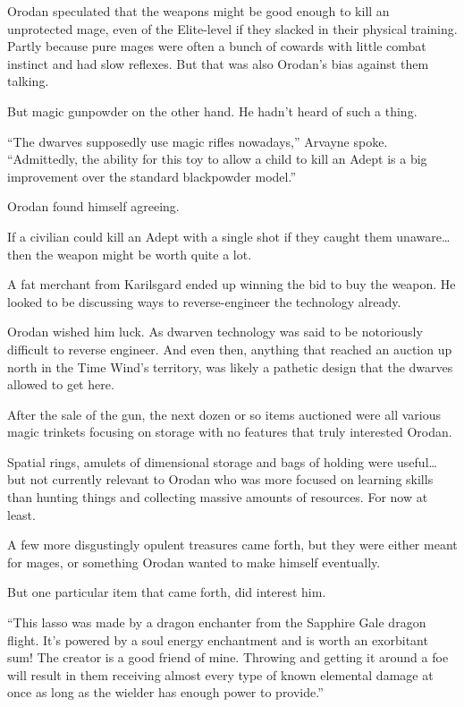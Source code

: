 \documentclass[a4paper,10pt]{book}
\begin{document}
Orodan speculated that the weapons might be good enough to kill an unprotected mage, even of the Elite-level if they slacked in their physical training. Partly because pure mages were often a bunch of cowards with little combat instinct and had slow reflexes. But that was also Orodan’s bias against them talking.\par
But magic gunpowder on the other hand. He hadn’t heard of such a thing.\par
“The dwarves supposedly use magic rifles nowadays,” Arvayne spoke. “Admittedly, the ability for this toy to allow a child to kill an Adept is a big improvement over the standard blackpowder model.”\par
Orodan found himself agreeing.\par
If a civilian could kill an Adept with a single shot if they caught them unaware… then the weapon might be worth quite a lot.\par
A fat merchant from Karilsgard ended up winning the bid to buy the weapon. He looked to be discussing ways to reverse-engineer the technology already.\par
Orodan wished him luck. As dwarven technology was said to be notoriously difficult to reverse engineer. And even then, anything that reached an auction up north in the Time Wind’s territory, was likely a pathetic design that the dwarves allowed to get here.\par
After the sale of the gun, the next dozen or so items auctioned were all various magic trinkets focusing on storage with no features that truly interested Orodan.\par
Spatial rings, amulets of dimensional storage and bags of holding were useful… but not currently relevant to Orodan who was more focused on learning skills than hunting things and collecting massive amounts of resources. For now at least.\par
A few more disgustingly opulent treasures came forth, but they were either meant for mages, or something Orodan wanted to make himself eventually.\par
But one particular item that came forth, did interest him.\par
“This lasso was made by a dragon enchanter from the Sapphire Gale dragon flight. It’s powered by a soul energy enchantment and is worth an exorbitant sum! The creator is a good friend of mine. Throwing and getting it around a foe will result in them receiving almost every type of known elemental damage at once as long as the wielder has enough power to provide.”\par
\end{document}
